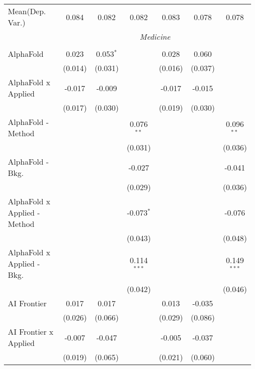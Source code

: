 \begin{tabular}{lcccccc}
Mean(Dep. Var.) & 0.084 & 0.082 & 0.082 & 0.083 & 0.078 & 0.078 \\
 & \multicolumn{6}{c}{\textit{Medicine}} \\ \\
   AlphaFold                      & 0.023   & 0.053$^{*}$  &                & 0.028   & 0.060          &   \\   
                                  & (0.014) & (0.031)      &                & (0.016) & (0.037)        &   \\   
   AlphaFold x Applied            & -0.017  & -0.009       &                & -0.017  & -0.015         &   \\   
                                  & (0.017) & (0.030)      &                & (0.019) & (0.030)        &   \\   
   AlphaFold - Method             &         &              & 0.076$^{**}$   &         &                & 0.096$^{**}$\\   
                                  &         &              & (0.031)        &         &                & (0.036)\\   
   AlphaFold - Bkg.               &         &              & -0.027         &         &                & -0.041\\   
                                  &         &              & (0.029)        &         &                & (0.036)\\   
   AlphaFold x Applied - Method   &         &              & -0.073$^{*}$   &         &                & -0.076\\   
                                  &         &              & (0.043)        &         &                & (0.048)\\   
   AlphaFold x Applied - Bkg.     &         &              & 0.114$^{***}$  &         &                & 0.149$^{***}$\\   
                                  &         &              & (0.042)        &         &                & (0.046)\\   
   AI Frontier                    & 0.017   & 0.017        &                & 0.013   & -0.035         &   \\   
                                  & (0.026) & (0.066)      &                & (0.029) & (0.086)        &   \\   
   AI Frontier x Applied          & -0.007  & -0.047       &                & -0.005  & -0.037         &   \\   
                                  & (0.019) & (0.065)      &                & (0.021) & (0.060)        &   \\   

\end{tabular}
